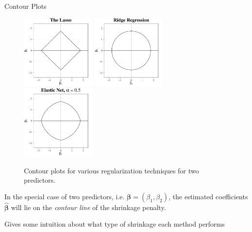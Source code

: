 \documentclass[8pt]{beamer}
\newcommand{\mydef}[1]{\textcolor{SteelBlue3}{\textit{#1}}} %
\begin{document}
\begin{frame}{Contour Plots}

\begin{figure}
    \centering
    \includegraphics[width = 0.33\textwidth]{cont_lasso.pdf}
    \includegraphics[width = 0.33\textwidth]{cont_ridge.pdf}
    \includegraphics[width = 0.33\textwidth]{cont_enet.pdf}
    \caption{Contour plots for various regularization techniques for two predictors.}
    \label{mult_cont}
\end{figure} 

In the special case of two predictors, i.e. $\bm{\beta} = (\beta_1,\beta_2)$, the estimated coefficients $\hat{\bm{\beta}}$ will lie on the \mydef{contour line} of the shrinkage penalty. 

Gives some intuition about what type of shrinkage each method performs  

    
\end{frame}
\end{document}

